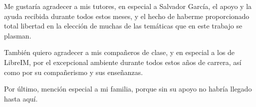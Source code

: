 Me gustaría agradecer a mis tutores, en especial a Salvador García, el apoyo y la ayuda recibida durante
todos estos meses, y el hecho de haberme proporcionado total libertad en la elección de muchas de las temáticas que en 
este trabajo se plasman.

También quiero agradecer a mis compañeros de clase, y en especial a los de LibreIM, por el excepcional ambiente 
durante todos estos años de carrera, así como por su compañerismo y sus enseñanzas.

Por último, mención especial a mi familia, porque sin su apoyo no habría llegado hasta aquí.